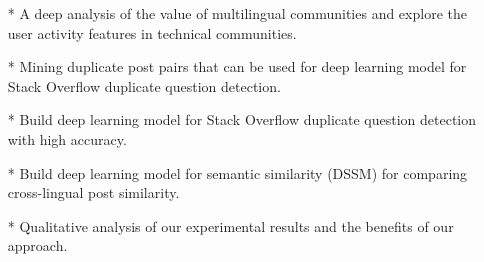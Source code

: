 	\begin{itemize}
		\item[*] A deep analysis of the value of multilingual communities and explore the user activity features in technical communities.
		\item[*] Mining duplicate post pairs that can be used for deep learning model for Stack Overflow duplicate question detection.
		\item[*] Build deep learning model for Stack Overflow duplicate question detection with high accuracy.
		\item[*] Build deep learning model for semantic similarity (DSSM) for comparing cross-lingual post similarity.
		\item[*] Qualitative analysis of our experimental results and the benefits of our approach.
	\end{itemize}
	\par

